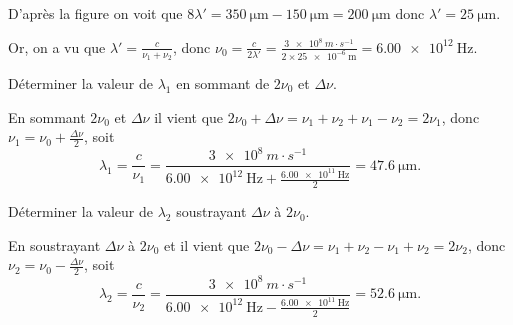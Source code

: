 	
	\begin{corrige}
		D'après la figure on voit que $8\lambda' = \SI{350}{\micro\meter} - \SI{150}{\micro\meter} = \SI{200}{\micro\meter}$ donc $\lambda' = \SI{25}{\micro\meter}$.

		Or, on a vu que $\lambda' = \frac{c}{\nu_1 + \nu_2}$, donc 
		$
		\nu_0 = \frac{c}{2\lambda'} = \frac{\SI{3e8}{m \cdot s^{-1} }}{ 2\times\SI{25e-6}{\meter} } = \SI{6.00e12}{\hertz}
		$.
	\end{corrige}
	



\begin{enonce}
	Déterminer la valeur de $\lambda_1$ en sommant de $2\nu_0$ et $\Delta \nu$.
\end{enonce}
	
	
	\begin{corrige}
		En sommant $2 \nu_0$ et $\Delta \nu$ il vient que
		$
		2 \nu_0 + \Delta \nu = \nu_1 + \nu_2 + \nu_1 - \nu_2 = 2\nu_1
		$, donc $\nu_1 = \nu_0 + \frac{\Delta\nu}{2}$, soit
		$$
		\lambda_1 = \frac{c}{\nu_1} = \frac{\SI{3e8}{m \cdot s^{-1} }}{ \SI{6.00e12}{\hertz} + \frac{\SI{6.00e11}{\hertz}}{2} } = \SI{47.6}{\micro\meter}.
		$$
	\end{corrige}
	



\begin{enonce}
	Déterminer la valeur de $\lambda_2$ soustrayant $\Delta \nu$ à $2 \nu_0$.
\end{enonce}
	
	
	\begin{corrige}
		En soustrayant $\Delta \nu$ à $2 \nu_0$ et  il vient que
		$
		2 \nu_0 - \Delta \nu = \nu_1 + \nu_2 - \nu_1 + \nu_2 = 2\nu_2
		$, donc $\nu_2 = \nu_0 - \frac{\Delta\nu}{2}$, soit
		$$
		\lambda_2 = \frac{c}{\nu_2} = \frac{\SI{3e8}{m \cdot s^{-1} }}{ \SI{6.00e12}{\hertz} - \frac{\SI{6.00e11}{\hertz}}{2} } = \SI{52.6}{\micro\meter}.
		$$
	\end{corrige}
	
